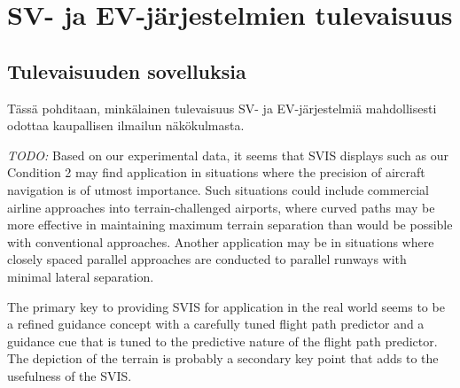 \documentclass[utf8,bachelor,manualbib]{gradu3}
\begin{document}
\chapter{SV- ja EV-järjestelmien tulevaisuus}

\section{Tulevaisuuden sovelluksia}

Tässä pohditaan, minkälainen tulevaisuus SV- ja EV-järjestelmiä mahdollisesti odottaa kaupallisen ilmailun näkökulmasta.

\emph{TODO:}
Based on our experimental data, it seems that SVIS displays such as our Condition
2 may find application in situations where the precision of aircraft navigation is of
utmost importance. Such situations could include commercial airline approaches
into terrain-challenged airports, where curved paths may be more effective in
maintaining maximum terrain separation than would be possible with conventional
approaches. Another application may be in situations where closely spaced
parallel approaches are conducted to parallel runways with minimal lateral separation. \citep{schnellym2004}

The primary key to
providing SVIS for application in the real world seems to be a refined guidance
concept with a carefully tuned flight path predictor and a guidance cue that is tuned
to the predictive nature of the flight path predictor. The depiction of the terrain is
probably a secondary key point that adds to the usefulness of the SVIS. \citep{schnellym2004}
\end{document}
